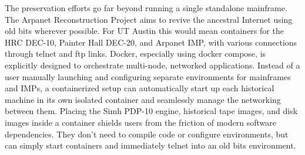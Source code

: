 The preservation efforts go far beyond running a single standalone mainframe. The Arpanet Reconstruction Project aims to revive the ancestral Internet using old bits wherever possible. For UT Austin this would mean containers for the HRC DEC-10, Painter Hall DEC-20, and Arpanet IMP, with various connections through telnet and ftp links. Docker, especially using docker compose, is explicitly designed to orchestrate multi-node, networked applications. Instead of a user manually launching and configuring separate environments for mainframes and IMPs, a containerized setup can automatically start up each historical machine in its own isolated container and seamlessly manage the networking between them. Placing the Simh PDP-10 engine, historical tape images, and disk images inside a container shields users from the friction of modern software dependencies. They don't need to compile code or configure environments, but can simply start containers and immediately telnet into an old bits environment.
